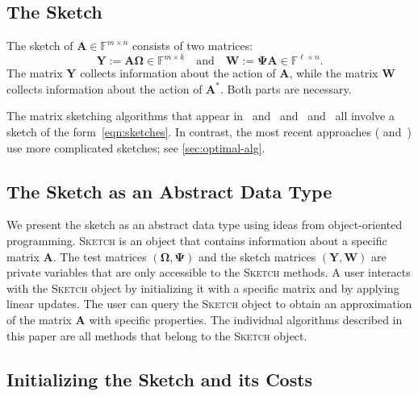 \documentclass[final]{siamart1116}
\numberwithin{equation}{section}
\numberwithin{theorem}{section}
\numberwithin{figure}{section}
\newcommand{\F}{\mathbb{F}}
\newcommand{\mtx}[1]{\bm{#1}}
\begin{document}
\subsection{The Sketch}
\label{sec:sketch}

The sketch of $\mtx{A} \in \F^{m \times n}$
consists of two matrices:
\begin{equation} \label{eqn:sketches}
\mtx{Y} := \mtx{A} \mtx{\Omega} \in \F^{m \times k}
\quad\text{and}\quad
\mtx{W} := \mtx{\Psi} \mtx{A} \in \F^{\ell \times n}.
\end{equation}
The matrix $\mtx{Y}$ collects information about the action
of $\mtx{A}$, while the matrix $\mtx{W}$ collects information
about the action of $\mtx{A}^*$.  Both parts are necessary.


\begin{remark}
The matrix sketching
algorithms that appear in~\cite[Sec.~5.2]{WLRT08:Fast-Randomized}
and~\cite[Thm.~4.9]{CW09:Numerical-Linear}
and~\cite[Sec.~5.5]{HMT11:Finding-Structure}
and~\cite[Thm.~4.3]{Woo14:Sketching-Tool}
all involve a sketch of the form~\cref{eqn:sketches}.
In contrast, the most recent approaches (\cite[Sec.~6.1.2]{BWZ16:Optimal-Principal-STOC}
and~\cite[Sec.~3]{Upa16:Fast-Space-Optimal}) use more complicated
sketches; see \cref{sec:optimal-alg}.
\end{remark}

\subsection{The Sketch as an Abstract Data Type}

We present the sketch as an abstract data type
using ideas from object-oriented programming.
\textsc{Sketch} is an object that contains
information about a specific matrix $\mtx{A}$.
The test matrices $(\mtx{\Omega}, \mtx{\Psi})$
and the sketch matrices $(\mtx{Y}, \mtx{W})$
are private variables that are only accessible to the
\textsc{Sketch} methods.
A user interacts with the \textsc{Sketch} object by initializing it
with a specific matrix and by applying linear
updates.  The user can query the \textsc{Sketch} object
to obtain an approximation of the matrix $\mtx{A}$
with specific properties.  The individual algorithms
described in this paper are all methods that
belong to the \textsc{Sketch} object.

\subsection{Initializing the Sketch and its Costs}
\end{document}
